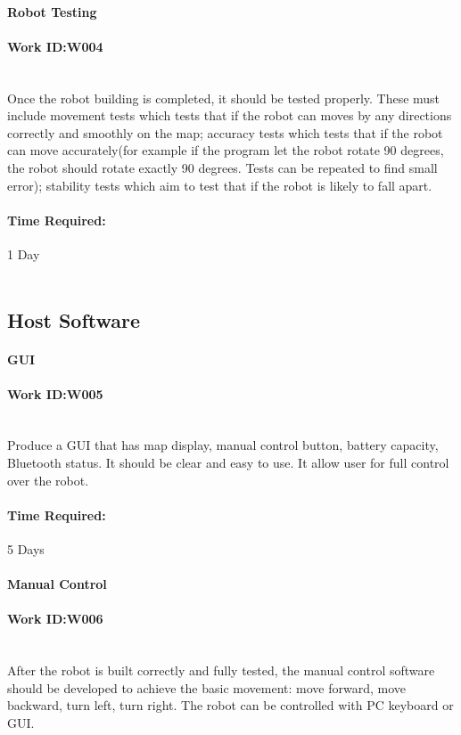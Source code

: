 \documentclass[11pt, a4paper]{report}
\begin{document}
\paragraph{Robot Testing}
\paragraph{Work ID:W004}\\
Once the robot building is completed, it should be tested properly. These must include movement tests which tests that if the robot can moves by any directions correctly and smoothly on the map; accuracy tests which tests that if the robot can move accurately(for example if the program let the robot rotate 90 degrees, the robot should rotate exactly 90 degrees. Tests can be repeated to find small error); stability tests which aim to test that if the robot is likely to fall apart.
\paragraph{Time Required:}1 Day
\\
\\

\subsection{Host Software}
\paragraph{GUI}
\paragraph{Work ID:W005}\\
Produce a GUI that has map display, manual control button, battery capacity, Bluetooth status. It should be clear and easy to use. It allow user for full control over the robot.
\paragraph{Time Required:}5 Days



\paragraph{Manual Control}
\paragraph{Work ID:W006}\\
After the robot is built correctly and fully tested, the manual control software should be developed to achieve the basic movement: move forward, move backward, turn left, turn right. The robot can be controlled with PC keyboard or GUI.
\end{document}
